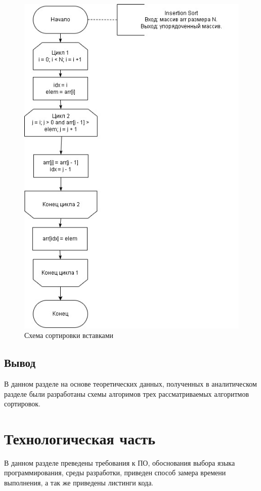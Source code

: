 \documentclass[12pt]{report}
\begin{document}
	\begin{figure}[h]
		\centering
		\includegraphics[width=0.9\linewidth]{insertion}
		\caption{Схема сортировки вставками}
		\label{fig:schema_insertion}
	\end{figure}
	
	\section{Вывод}
	
	В данном разделе на основе теоретических данных, полученных в аналитическом разделе были разработаны схемы алгоримов трех рассматриваемых алгоритмов сортировок.
	
	\chapter{Технологическая часть}
	
	В данном разделе преведены требования к ПО, обоснования выбора языка программирования, среды разработки, приведен способ замера времени выполнения, а так же приведены листинги кода.
	
\end{document}
